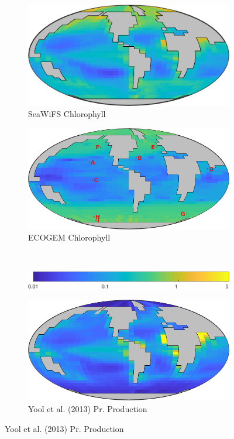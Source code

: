 \documentclass{article}
\begin{document}
\begin{figure}[htbp]
\centering
\begin{subfigure}{.5\textwidth}
 \caption{SeaWiFS Chlorophyll}
\includegraphics[width=0.95\linewidth]{../Separate_figures/OBSERVATIONS/SeaWiFS_on_GEnIE.png}
\end{subfigure}%
\begin{subfigure}{.5\textwidth}
 \caption{ECOGEM Chlorophyll}
\includegraphics[width=0.95\linewidth]{../Separate_figures/ECOGEM/Surface_Chl_Biomass.png}
\end{subfigure}%
\\[+0.2cm]
\begin{subfigure}{.5\textwidth}
 \includegraphics[width=0.95\linewidth]{../Separate_figures/ECOGEM/Surface_Chl_Biomass_clrbar.png}
\end{subfigure}
\begin{subfigure}{.5\textwidth}
 \caption{Yool et al. (2013) Pr. Production}
\includegraphics[width=0.95\linewidth]{../Separate_figures/OBSERVATIONS/Composite_PP_on_GEnIE.png}

\end{subfigure}
\end{figure}
\end{document}
